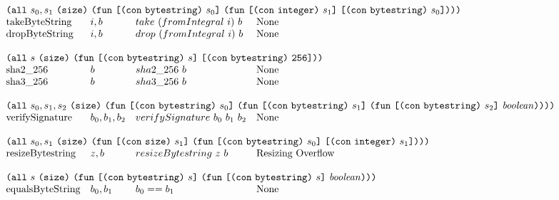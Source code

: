 \documentclass[../main.tex]{subfiles}
\begin{document}
\begin{figure*}[t]
\[\begin{array}{llll}
        \multicolumn{4}{l}{
          \allT{s_0,s_1}{\sizeK{}}{
            \funT{\appT{\conT{\conBytestringType{}}}{s_0}}
                 {\funT{\appT{\conT{\conIntegerType{}}}{s_1}}
                       {\appT{\conT{\conBytestringType{}}}{s_0}}}}}\\
        \mathrm{takeByteString}    &   i, b     & take ~ (fromIntegral ~ i) ~ b   &   \textrm{None} \\
        \mathrm{dropByteString}    &   i, b     & drop ~ (fromIntegral ~ i) ~ b   &   \textrm{None} \\
        &&\\
        
        \multicolumn{4}{l}{
          \allT{s}{\sizeK{}}{
            \funT{\appT{\conT{\conBytestringType{}}}{s}}
                 {\appT{\conT{\conBytestringType{}}}{\size{256}}}}}\\
        \mathrm{sha2\_256}         &   b           & sha2\_256 ~ b    & \textrm{None}                \\
        \mathrm{sha3\_256}         &   b           & sha3\_256~ b     & \textrm{None}                \\
        &&\\
        
        \multicolumn{4}{l}{
          \allT{s_0,s_1,s_2}{\sizeK{}}{
            \funT{\appT{\conT{\conBytestringType{}}}{s_0}}
                 {\funT{\appT{\conT{\conBytestringType{}}}{s_1}}
                       {\funT{\appT{\conT{\conBytestringType{}}}{s_2}}
                             {\mathit{boolean}}}}}}\\
        \mathrm{verifySignature}   &   b_0, b_1, b_2           & verifySignature ~ b_0 ~ b_1 ~ b_2   &   \textrm{None}          \\
        &&\\
        
        \multicolumn{4}{l}{
          \allT{s_0,s_1}{\sizeK{}}{
            \funT{\appT{\conT{\conSizeType{}}}{s_1}}
                 {\funT{\appT{\conT{\conBytestringType{}}}{s_0}}
                       {\appT{\conT{\conIntegerType{}}}{s_1}}}}} \\
        \mathrm{resizeBytestring}   &   z, b   &   resizeBytestring ~ z ~ b   &   \textrm{Resizing Overflow} \\
        &&\\
        
        \multicolumn{4}{l}{
          \allT{s}{\sizeK{}}{
            \funT{\appT{\conT{\conBytestringType{}}}{s}}
                 {\funT{\appT{\conT{\conBytestringType{}}}{s}}
                       {\mathit{boolean}}}}}\\
        \mathrm{equalsByteString}  &   b_0 , b_1   & b_0 == b_1   &   \textrm{None}  \\
        &&\\
        

\end{array}\]
\end{figure*}
\end{document}
